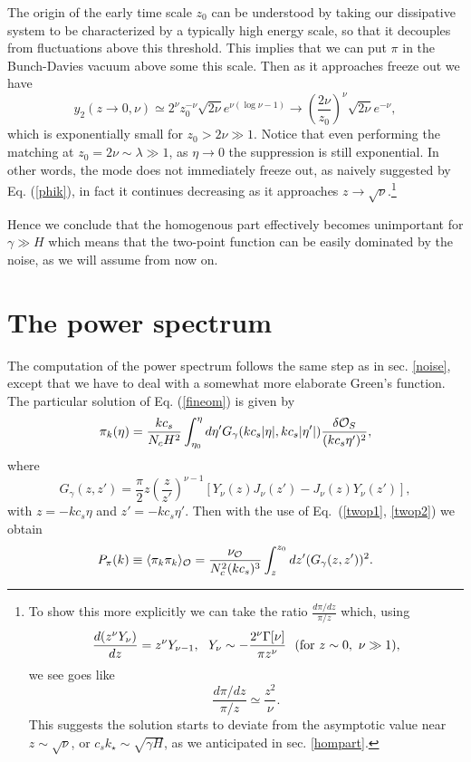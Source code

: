 \documentclass[11pt,amsmath,floats,floatfix,nofootinbib,secnumarabic, superscriptaddress, tightenlines]{revtex4}
\newcommand{\beq}{\begin{equation}}
\newcommand{\eeq}{\end{equation}}
\newcommand{\ee}{\end{equation}}
\newcommand{\calo}{{\cal O}}
\begin{document}
{The origin of the early time scale $z_0$ can be understood by taking our dissipative system to be characterized by a typically high energy scale, so that it decouples from fluctuations above this threshold. This implies that we can put $\pi$ in the Bunch-Davies vacuum above some this scale. Then as it approaches freeze out we have
\beq
\label{f2z0nu}
y_2(z \to 0,\nu) \simeq 2^\nu z_0^{-\nu}\sqrt{2\nu} e^{\nu(\log\nu-1)} \to \left(\frac{2\nu}{z_0}\right)^\nu\sqrt{2\nu} e^{-\nu},
\eeq
which is exponentially small for $z_0> 2\nu \gg 1$. Notice that even performing the matching at $z_0=2\nu \sim \lambda \gg 1$,  as $\eta \to 0$ the suppression is still exponential. In other words, the mode does not immediately freeze out, as naively suggested by Eq. (\ref{phik}), in fact it continues decreasing as it approaches $z \to \sqrt{\nu}$.\footnote{To show this more explicitly we can take the ratio $\frac{d\pi/dz}{\pi/z}$ which, using
\beq
\frac{d (z^\nu Y_\nu)}{dz} =  z^\nu Y_{\nu-1}, ~~ Y_\nu \sim -\frac{2^\nu\Gamma[\nu]}{\pi z^\nu}~~({\rm for}~z\sim 0,~\nu\gg 1),
\eeq
we see goes like
\beq
\frac{d\pi/dz}{\pi/z} \simeq \frac{z^2}{\nu}.
\eeq
This suggests the solution starts to deviate from the asymptotic value near $z\sim \sqrt{\nu}$, or $c_sk_\star \sim \sqrt{\gamma H}$, as we anticipated in sec. \ref{hompart}. }

Hence we conclude that the homogenous part effectively becomes unimportant for $\gamma \gg H$ which means that the two-point function can be easily dominated by the noise, as we will assume from now on.

\section{The power spectrum}\label{power}

The computation of the power spectrum follows the same step as in sec. \ref{noise}, except that we have to deal with a somewhat more elaborate Green's function. The particular solution of Eq. (\ref{fineom}) is given by
\beq \pi_k(\eta)=\frac{ k c_s}{N_cH^2}\int^{\eta}_{\eta_0} d\eta' G_{\gamma}(k c_s|\eta|,k c_s|\eta'|)\frac{\delta{ \calo}_S}{(k c_s{\eta'})^2 },\ee
where
\beq
\label{greengamma}
G_{\gamma}(z,z')=\frac{\pi}{2} z\left(\frac{z}{z'}\right)^{\nu-1} \left[Y_\nu(z) J_\nu (z')-J_\nu (z) Y_\nu(z')\right],
\eeq 
with $z=-k c_s\eta$ and  $z'=-k c_s\eta'$. Then with the use of Eq.~(\ref{twop1}, \ref{twop2}) we obtain
\beq \nonumber  P_{\pi}(k)\equiv \langle\pi_k\pi_k\rangle_\calo=\frac{\nu_{\calo}}{N_c^2(kc_s)^3}\int^{z_0}_z dz' (G_{\gamma}(z,z'))^2.
\eeq

}
\end{document}
